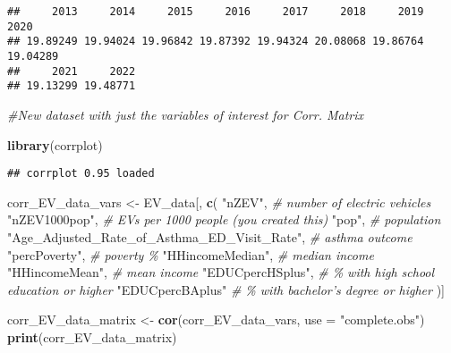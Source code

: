 \documentclass[
]{article}
\newenvironment{Shaded}{\begin{snugshade}}{\end{snugshade}}
\newcommand{\AttributeTok}[1]{\textcolor[rgb]{0.13,0.29,0.53}{#1}}
\newcommand{\CommentTok}[1]{\textcolor[rgb]{0.56,0.35,0.01}{\textit{#1}}}
\newcommand{\ConstantTok}[1]{\textcolor[rgb]{0.56,0.35,0.01}{#1}}
\newcommand{\FunctionTok}[1]{\textcolor[rgb]{0.13,0.29,0.53}{\textbf{#1}}}
\newcommand{\NormalTok}[1]{#1}
\newcommand{\OtherTok}[1]{\textcolor[rgb]{0.56,0.35,0.01}{#1}}
\newcommand{\SpecialCharTok}[1]{\textcolor[rgb]{0.81,0.36,0.00}{\textbf{#1}}}
\newcommand{\StringTok}[1]{\textcolor[rgb]{0.31,0.60,0.02}{#1}}
\begin{document}
\begin{Shaded}
\end{Shaded}

\begin{verbatim}
##     2013     2014     2015     2016     2017     2018     2019     2020 
## 19.89249 19.94024 19.96842 19.87392 19.94324 20.08068 19.86764 19.04289 
##     2021     2022 
## 19.13299 19.48771
\end{verbatim}

\begin{Shaded}
\begin{Highlighting}[]
\CommentTok{\#New dataset with just the variables of interest for Corr. Matrix}

\FunctionTok{library}\NormalTok{(corrplot)}
\end{Highlighting}
\end{Shaded}

\begin{verbatim}
## corrplot 0.95 loaded
\end{verbatim}

\begin{Shaded}
\begin{Highlighting}[]
\NormalTok{corr\_EV\_data\_vars }\OtherTok{\textless{}{-}}\NormalTok{ EV\_data[, }\FunctionTok{c}\NormalTok{(}
  \StringTok{"nZEV"}\NormalTok{,                      }\CommentTok{\# number of electric vehicles}
  \StringTok{"nZEV1000pop"}\NormalTok{,              }\CommentTok{\# EVs per 1000 people (you created this)}
  \StringTok{"pop"}\NormalTok{,                      }\CommentTok{\# population}
  \StringTok{"Age\_Adjusted\_Rate\_of\_Asthma\_ED\_Visit\_Rate"}\NormalTok{,  }\CommentTok{\# asthma outcome}
  \StringTok{"percPoverty"}\NormalTok{,              }\CommentTok{\# poverty \%}
  \StringTok{"HHincomeMedian"}\NormalTok{,           }\CommentTok{\# median income}
  \StringTok{"HHincomeMean"}\NormalTok{,             }\CommentTok{\# mean income}
  \StringTok{"EDUCpercHSplus"}\NormalTok{,           }\CommentTok{\# \% with high school education or higher}
  \StringTok{"EDUCpercBAplus"}            \CommentTok{\# \% with bachelor’s degree or higher}
\NormalTok{)]}

\NormalTok{corr\_EV\_data\_matrix }\OtherTok{\textless{}{-}} \FunctionTok{cor}\NormalTok{(corr\_EV\_data\_vars, }\AttributeTok{use =} \StringTok{"complete.obs"}\NormalTok{)}
\FunctionTok{print}\NormalTok{(corr\_EV\_data\_matrix)}
\end{Highlighting}
\end{Shaded}
\end{document}

